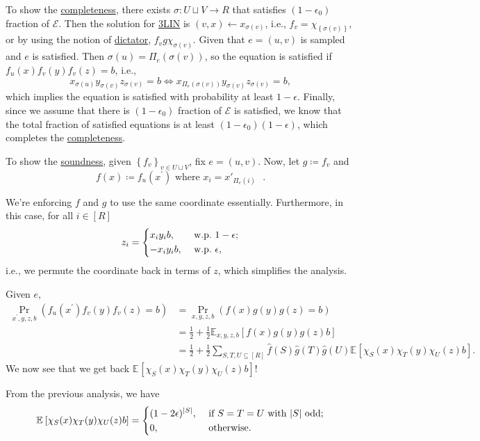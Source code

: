 To show the \hyperref[def:completeness]{completeness}, there exists \(\sigma \colon U \sqcup V \to R\) that satisfies \((1 - \epsilon _0)\) fraction of \(\mathcal{E} \). Then the solution for \hyperref[prb:max-3LIN]{3LIN} is \((v, x) \gets x_{\sigma (v)}\), i.e., \(f_v = \chi _{\left\{ \sigma (v) \right\} }\), or by using the notion of \hyperref[def:dictation]{dictator}, \(f_v g \chi _{\sigma (v)}\). Given that \(e=(u, v)\) is sampled and \(e\) is satisfied. Then \(\sigma (u) = \Pi _e(\sigma (v))\), so the equation is satisfied if \(f_u(x) f_v(y) f_v(z) = b\), i.e.,
\[
	x_{\sigma (u)} y_{\sigma (v)} z_{\sigma (v)} = b
	\iff x_{\Pi_e (\sigma (v))} y_{\sigma (v)} z_{\sigma (v)} = b,
\]
which implies the equation is satisfied with probability at least \(1 - \epsilon\). Finally, since we assume that there is \((1-\epsilon _0)\) fraction of \(\mathcal{E} \) is satisfied, we know that the total fraction of satisfied equations is at least \((1-\epsilon _0) (1-\epsilon )\), which completes the \hyperref[def:completeness]{completeness}.

To show the \hyperref[def:soundness]{soundness}, given \(\left\{ f_v \right\} _{v\in U \sqcup V}\), fix \(e=(u, v)\). Now, let \(g\coloneqq f_v\) and
\[
	f(x) \coloneqq f_u(x^\prime ) \text{ where \(x_i = x'_{\Pi_e(i)}\) }.
\]
\begin{note}
	We're enforcing \(f\) and \(g\) to use the same coordinate essentially. Furthermore, in this case, for all \(i\in [R]\)
	\[
		z_i = \begin{dcases}
			x_i y_i b,  & \text{ w.p.\ } 1-\epsilon  ; \\
			-x_i y_i b, & \text{ w.p.\ } \epsilon  ,
		\end{dcases}
	\]
	i.e., we permute the coordinate back in terms of \(z\), which simplifies the analysis.
\end{note}

Given \(e\),
\[
	\begin{split}
		\Pr_{x^\prime , y, z, b}(f_u(x^\prime ) f_v(y) f_v(z) = b)
		 & = \Pr_{x , y, z, b}(f(x) g(y) g(z) = b)                                                                                                                      \\
		 & = \frac{1}{2} + \frac{1}{2} \mathbb{E}_{x, y, z, b}\left[f(x) g(y) g(z) b \right]                                                                            \\
		 & = \frac{1}{2} + \frac{1}{2} \sum_{S, T, U \subseteq [R]} \hat{f} (S) \hat{g} (T) \hat{g} (U) \mathbb{E}_{}\left[\chi _S(x) \chi _T (y) \chi _U(z) b \right].
	\end{split}
\]
We now see that we get back \(\mathbb{E}_{}\left[\chi _S(x) \chi _T (y) \chi _U(z) b \right]\)!
\begin{prev}
	From the previous analysis, we have
	\[
		\mathbb{E}_{}\left[\chi _S(x) \chi _T (y) \chi _U(z) b \right]
		= \begin{dcases}
			(1-2\epsilon )^{\vert S \vert }, & \text{ if } S=T=U \text{ with \(\vert S \vert \) odd}  ; \\
			0,                               & \text{ otherwise}  .
		\end{dcases}
	\]
\end{prev}

